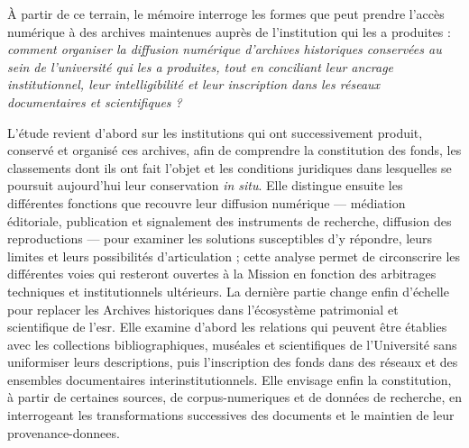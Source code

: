 À partir de ce terrain, le mémoire interroge les formes que peut prendre l'accès numérique à des archives maintenues auprès de l'institution qui les a produites : \emph{comment organiser la diffusion numérique d'archives historiques conservées au sein de l'université qui les a produites, tout en conciliant leur ancrage institutionnel, leur intelligibilité et leur inscription dans les réseaux documentaires et scientifiques ?}

L'étude revient d'abord sur les institutions qui ont successivement produit, conservé et organisé ces archives, afin de comprendre la constitution des fonds, les classements dont ils ont fait l'objet et les conditions juridiques dans lesquelles se poursuit aujourd'hui leur conservation \emph{in situ}. Elle distingue ensuite les différentes fonctions que recouvre leur diffusion numérique --- médiation éditoriale, publication et \gls{signalement} des instruments de recherche, diffusion des reproductions --- pour examiner les solutions susceptibles d'y répondre, leurs limites et leurs possibilités d'articulation ; cette analyse permet de circonscrire les différentes voies qui resteront ouvertes à la Mission en fonction des arbitrages techniques et institutionnels ultérieurs. La dernière partie change enfin d'échelle pour replacer les Archives historiques dans l'écosystème patrimonial et scientifique de l'\gls{esr}. Elle examine d'abord les relations qui peuvent être établies avec les collections bibliographiques, muséales et scientifiques de l'Université sans uniformiser leurs descriptions, puis l'inscription des fonds dans des réseaux et des ensembles documentaires interinstitutionnels. Elle envisage enfin la constitution, à partir de certaines sources, de \glspl{corpus-numerique} et de données de recherche, en interrogeant les transformations successives des documents et le maintien de leur \gls{provenance-donnees}.